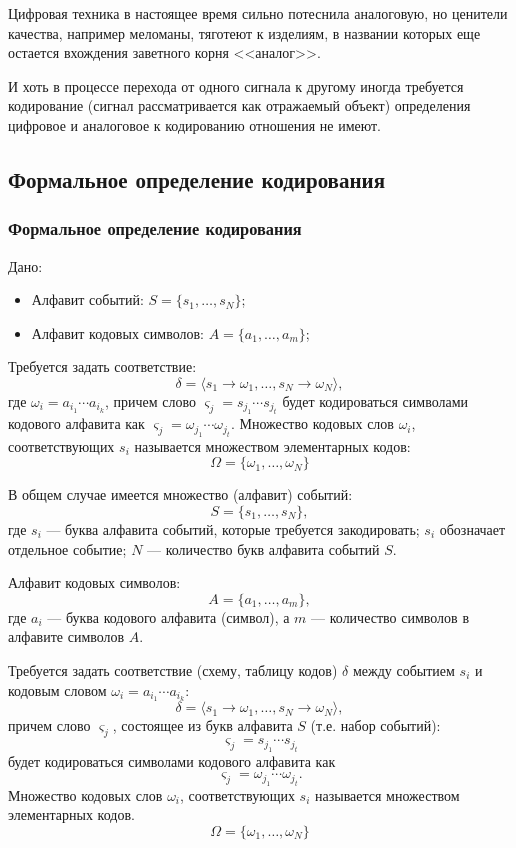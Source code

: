 Цифровая техника в настоящее время сильно потеснила аналоговую, но ценители качества, например меломаны, тяготеют к изделиям, в названии которых еще остается вхождения заветного корня <<аналог>>.

И хоть в процессе перехода от одного сигнала к другому иногда требуется кодирование (сигнал рассматривается как отражаемый объект) определения цифровое и аналоговое к кодированию отношения не имеют.


\subsection{Формальное определение кодирования}


\begin{frame}
\frametitle{Формальное определение кодирования}
\begin{definition}
    Дано:
    \begin{itemize}
        \item Алфавит \alert{событий}: $S=\{s_1,\ldots,s_N\}$;
        \item Алфавит кодовых \alert{символов}: $A=\{a_1,\ldots,a_m\}$;
    \end{itemize}
    
    Требуется задать соответствие:
    \[\delta=\langle s_1\to \omega_1,\ldots,s_N\to \omega_N\rangle,\]
    где $\omega_i=a_{i_1}\cdots a_{i_k}$, причем слово $\varsigma_j=s_{j_1}\cdots s_{j_t}$ будет кодироваться символами кодового алфавита как $\varsigma_j=\omega_{j_1}\cdots \omega_{j_t}$.
    Множество кодовых слов $\omega_i$, соответствующих $s_i$ называется множеством \alert{элементарных} кодов:
    \[\Omega=\{\omega_1,\ldots,\omega_N\}\]
\end{definition} 
\end{frame}


В общем случае имеется множество (алфавит) событий:
\[S=\{s_1,\ldots,s_N\},\]
где $s_i$ --- буква алфавита событий, которые требуется закодировать; $s_i$ обозначает отдельное событие; $N$ --- количество букв алфавита событий $S$.

Алфавит кодовых символов:
\[A=\{a_1,\ldots,a_m\},\]
где $a_i$ --- буква кодового алфавита (символ), а $m$ --- количество символов в алфавите символов $A$.

Требуется задать соответствие (схему, таблицу кодов) $\delta$ между событием $s_i$ и кодовым словом $\omega_i=a_{i_1}\cdots a_{i_k}$:
\[\delta=\langle s_1\to \omega_1,\ldots,s_N\to \omega_N\rangle,\]
причем слово $\varsigma_j$, состоящее из букв алфавита $S$ (т.е. набор событий):
\[\varsigma_j=s_{j_1}\cdots s_{j_t}\]
будет кодироваться символами кодового алфавита как
\[\varsigma_j=\omega_{j_1}\cdots \omega_{j_t}.\]
Множество кодовых слов $\omega_i$, соответствующих $s_i$ называется множеством элементарных кодов.
\[\Omega=\{\omega_1,\ldots,\omega_N\}\]


